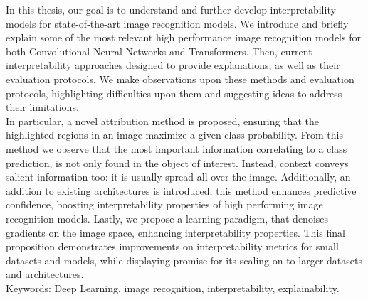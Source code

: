 \noindent In this thesis, our goal is to understand and further develop interpretability models for 
state-of-the-art image recognition models. We introduce and briefly explain some of the most 
relevant high performance image recognition models for both Convolutional Neural Networks 
and Transformers. Then, current interpretability approaches designed to provide 
explanations, as well as their evaluation protocols. We make observations upon 
these methods and evaluation protocols, highlighting difficulties upon them and suggesting ideas 
to address their limitations.\\

\noindent In particular, a novel attribution method is proposed, ensuring that the highlighted 
regions in an image maximize a given class probability. From this method we observe that the 
most important information correlating to a class prediction, is not only found in the object of 
interest. Instead, context conveys salient information too: it is usually spread all over the image. 
Additionally, an addition to existing architectures is introduced, this method enhances predictive 
confidence, boosting interpretability properties of high performing image recognition models. Lastly, we 
propose a learning paradigm, that denoises gradients on the image space, enhancing 
interpretability properties. This final proposition demonstrates improvements on interpretability 
metrics for small datasets and models, while displaying promise for its scaling on to larger 
datasets and architectures.\\

\vspace{0.5cm}
Keywords: Deep Learning, image recognition, interpretability, explainability.

